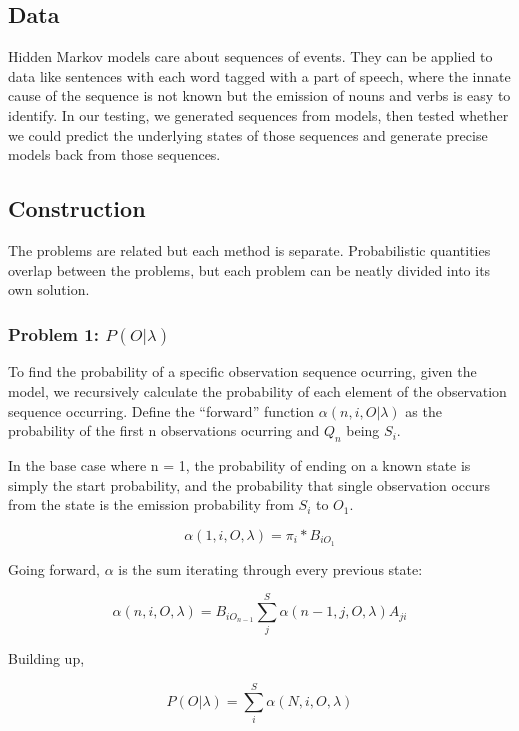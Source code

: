 \documentclass[11pt,a4paper]{article}
\begin{document}
\subsection{Data}
\label{Hidden Markov Models:Data}

Hidden Markov models care about sequences of events. They can be applied to data like sentences with each word tagged with a part of speech, where the innate cause of the sequence is not known but the emission of nouns and verbs is easy to identify. In our testing, we generated sequences from models, then tested whether we could predict the underlying states of those sequences and generate precise models back from those sequences.

\subsection{Construction}
\label{Hidden Markov Models:Construction}

The problems are related but each method is separate. Probabilistic quantities overlap between the problems, but each problem can be neatly divided into its own solution.

\subsubsection{Problem 1: $P(O|\lambda)$}
\label{Hidden Markov Models:Problem 1}

To find the probability of a specific observation sequence ocurring, given the model, we recursively calculate the probability of each element of the observation sequence occurring. Define the ``forward'' function $\alpha(n, i ,O|\lambda)$ as the probability of the first n observations ocurring and $Q_n$ being $S_i$.

In the base case where n = 1, the probability of ending on a known state is simply the start probability, and the probability that single observation occurs from the state is the emission probability from $S_i$ to $O_1$.

\[
\alpha(1, i, O, \lambda) = \pi_i * B_{iO_1}
\]

Going forward, $\alpha$ is the sum iterating through every previous state:

\[
\alpha(n, i, O, \lambda) = B_{iO_{n-1}} \sum_j^S{\alpha(n - 1, j, O, \lambda)A_{ji}}
\]

Building up,

\[
P(O|\lambda) = \sum_i^S{\alpha(N, i, O, \lambda)}
\]
\end{document}
